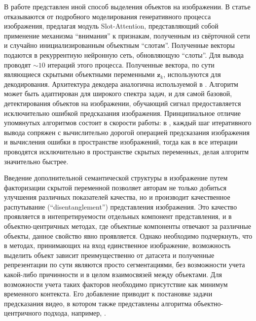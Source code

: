 В работе \cite{SlotAtt} представлен иной способ выделения объектов на  изображении. 
В статье отказываются от подробного моделирования генеративного процесса изображения, предлагая модуль Slot-Attention, представляющий собой применение механизма ``внимания'' к признакам, полученным из свёрточной сети и случайно инициализированным объектным ``слотам''. 
Полученные векторы подаются в рекуррентную нейронную сеть, обновляющую ``слоты''. 
Для вывода проводят $\sim 10$ итераций этого процесса.
Полученные вектора, по сути являющиеся скрытыми объектными переменными $\mathbf{z}_k$, используются для декодирования. 
Архитектура декодера аналогична используемой в \cite{IODINE}. 
Алгоритм может быть адаптирован для широкого спектра задач, и для самой базовой, детектирования объектов на изображении, обучающий сигнал предоставляется исключительно ошибкой предсказания изображения. 
Принципиальное отличие упомянутых алгоритмов состоит в скорости работы: в \cite{IODINE}, каждый шаг итеративного вывода сопряжен с вычислительно дорогой операцией предсказания изображения и вычисления ошибки в пространстве изображений, тогда как в \cite{SlotAtt} все итерации проводятся исключительно в пространстве скрытых переменных, делая алгоритм значительно быстрее.

Введение дополнительной семантической структуры в изображение путем факторизации скрытой переменной позволяет авторам не только добиться улучшения различных показателей качества, но и производит качественное распутывание (``disentanglement'') представления изображения. 
Это качество проявляется в интепретируемости отдельных компонент представления, и в объектно-центричных методах, где объектные компоненты отвечают за различные объекты, данное свойство явно проявляется.
Однако необходимо подчеркнуть, что в методах, принимающих на вход единственное изображение, возможность выделить объект зависит преимущественно от датасета и полученные репрезентации по сути являются просто сегментациями, без возможности учета какой-либо причинности и в целом взаимосвязей между объектами.
Для возможности учета таких факторов необходимо присутствие как минимум временного контекста.
Его добавление приводит к постановке задачи предсказания видео, в котором также представлены алгоритма объектно-центричного подхода, например, \cite{oc_video_1, oc_video_2}.


